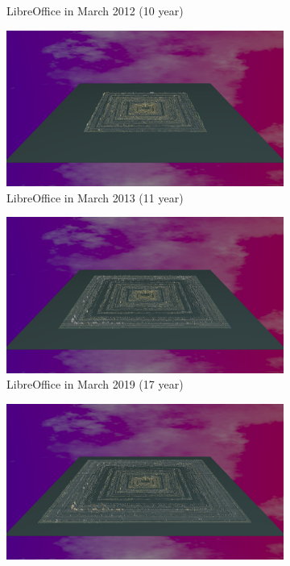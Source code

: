 \begin{figure}[ht]
\begin{subfigure}{0.48\textwidth}
        \caption{LibreOffice in March 2012 (10 year)} 
        \label{fig:Libre_V6_S3}
    \end{subfigure}\hspace*{\fill}
    \begin{subfigure}{0.48\textwidth}
        \includegraphics[width=\linewidth]{Libreoffice/Animation011.png}
        \caption{LibreOffice in March 2013 (11 year)} 
        \label{fig:Libre_V6_S4}
    \end{subfigure}
    \medskip
    \begin{subfigure}{0.48\textwidth}
        \includegraphics[width=\linewidth]{Libreoffice/Animation017.png}
        \caption{LibreOffice in March 2019 (17 year)} 
        \label{fig:Libre_V6_S5}
    \end{subfigure}\hspace*{\fill}
    \begin{subfigure}{0.48\textwidth}
        \includegraphics[width=\linewidth]{Libreoffice/Animation021.png}

\end{subfigure}
\end{figure}
